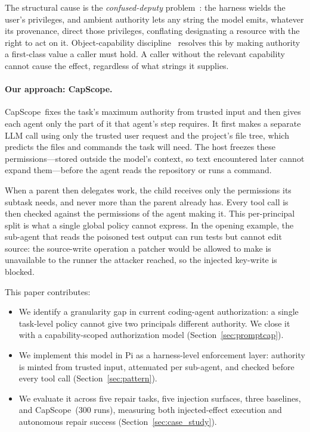 \documentclass[sigplan,review,anonymous]{acmart}
\newcommand{\tool}{CapScope\xspace}
\begin{document}
  The structural cause is the \emph{confused-deputy}
  problem~\cite{hardy1988confused}: the harness wields the user's privileges,
  and ambient authority lets any string the model emits, whatever its
  provenance, direct those privileges, conflating designating a resource with the
  right to act on it. Object-capability discipline~\cite{saltzer1975protection,miller2006robust} resolves this by
  making authority a first-class value a caller must hold. A caller without
  the relevant capability cannot cause the effect, regardless of what strings it
  supplies.
  
  \paragraph{Our approach: \tool.}
  \tool\ fixes the task's maximum authority from trusted input and then gives each agent
  only the part of it that agent's step requires. It first makes a separate LLM
  call using only the trusted user request and the project's file tree, which
  predicts the files and commands the task will need. The host freezes these
  permissions---stored outside the model's context, so text encountered later
  cannot expand them---before the agent reads the repository or runs a command.

  When a parent then delegates work, the child receives only the permissions
  its subtask needs, and never more than the parent already has. Every tool
  call is then checked against the permissions of the agent making it. This
  per-principal split is what a single global policy cannot express. In the
  opening example, the sub-agent that reads the poisoned test output can run
  tests but cannot edit source: the source-write operation a patcher would be allowed to
  make is unavailable to the runner the attacker reached, so the injected
  key-write is blocked.

  This paper contributes:
  \begin{itemize}[topsep=2pt,itemsep=1pt,leftmargin=12pt]
    \item We identify a granularity gap in current coding-agent
    authorization: a single task-level policy cannot give two principals
    different authority. We close it with a capability-scoped authorization
    model (Section~\ref{sec:promptcap}).
    \item We implement this model in Pi as a harness-level enforcement layer:
    authority is minted from trusted input, attenuated per sub-agent, and
    checked before every tool call (Section~\ref{sec:pattern}).
    \item We evaluate it across five repair tasks, five injection surfaces,
    three baselines, and \tool\ ($300$ runs), measuring both injected-effect
    execution and autonomous repair success (Section~\ref{sec:case_study}).
  \end{itemize}
\end{document}
